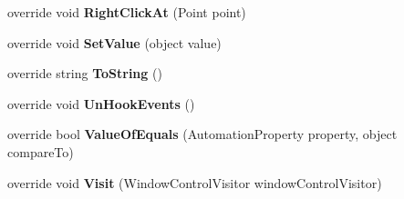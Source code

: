 \begin{DoxyCompactItemize}
\item 
\hypertarget{class_proto_test_1_1_golem_1_1_white_1_1_elements_1_1_white_table_ad5bf08d24627d708b1f3de73c019fe47}{override void {\bfseries Right\-Click\-At} (Point point)}\label{class_proto_test_1_1_golem_1_1_white_1_1_elements_1_1_white_table_ad5bf08d24627d708b1f3de73c019fe47}

\item 
\hypertarget{class_proto_test_1_1_golem_1_1_white_1_1_elements_1_1_white_table_a41046c51a8782ef4c66aae364984cee2}{override void {\bfseries Set\-Value} (object value)}\label{class_proto_test_1_1_golem_1_1_white_1_1_elements_1_1_white_table_a41046c51a8782ef4c66aae364984cee2}

\item 
\hypertarget{class_proto_test_1_1_golem_1_1_white_1_1_elements_1_1_white_table_a81a0e8542dbedbe882624ca35929b86e}{override string {\bfseries To\-String} ()}\label{class_proto_test_1_1_golem_1_1_white_1_1_elements_1_1_white_table_a81a0e8542dbedbe882624ca35929b86e}

\item 
\hypertarget{class_proto_test_1_1_golem_1_1_white_1_1_elements_1_1_white_table_ae185897b288d97e5baf60a8e794cfdb9}{override void {\bfseries Un\-Hook\-Events} ()}\label{class_proto_test_1_1_golem_1_1_white_1_1_elements_1_1_white_table_ae185897b288d97e5baf60a8e794cfdb9}

\item 
\hypertarget{class_proto_test_1_1_golem_1_1_white_1_1_elements_1_1_white_table_a4ae4fe0fc2fd09bb2ed69d272dd2dec6}{override bool {\bfseries Value\-Of\-Equals} (Automation\-Property property, object compare\-To)}\label{class_proto_test_1_1_golem_1_1_white_1_1_elements_1_1_white_table_a4ae4fe0fc2fd09bb2ed69d272dd2dec6}

\item 
\hypertarget{class_proto_test_1_1_golem_1_1_white_1_1_elements_1_1_white_table_aaf18fe3256ce6a08e77fcaf50dab2c33}{override void {\bfseries Visit} (Window\-Control\-Visitor window\-Control\-Visitor)}\label{class_proto_test_1_1_golem_1_1_white_1_1_elements_1_1_white_table_aaf18fe3256ce6a08e77fcaf50dab2c33}

\end{DoxyCompactItemize}
